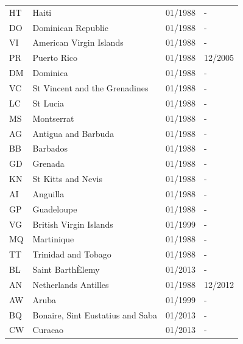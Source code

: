 \begin{footnotesize}
\begin{longtable}{p{0.5cm}p{9cm}p{2cm}p{2cm}}
HT	&	Haiti	&	01/1988	&	-	\\

DO	&	Dominican Republic	&	01/1988	&	-	\\

VI	&	American Virgin Islands	&	01/1988	&	-	\\

PR	&	Puerto Rico	&	01/1988	&	12/2005	\\

DM	&	Dominica	&	01/1988	&	-	\\

VC	&	St Vincent and the Grenadines	&	01/1988	&	-	\\

LC	&	St Lucia	&	01/1988	&	-	\\

MS	&	Montserrat	&	01/1988	&	-	\\

AG	&	Antigua and Barbuda	&	01/1988	&	-	\\

BB	&	Barbados	&	01/1988	&	-	\\

GD	&	Grenada	&	01/1988	&	-	\\

KN	&	St Kitts and Nevis	&	01/1988	&	-	\\

AI	&	Anguilla	&	01/1988	&	-	\\

GP	&	Guadeloupe	&	01/1988	&	-	\\

VG	&	British Virgin Islands	&	01/1999	&	-	\\

MQ	&	Martinique	&	01/1988	&	-	\\

TT	&	Trinidad and Tobago	&	01/1988	&	-	\\

BL	&	Saint BarthÈlemy	&	01/2013	&	-	\\

AN	&	Netherlands Antilles	&	01/1988	&	12/2012	\\

AW	&	Aruba	&	01/1999	&	-	\\

BQ	&	Bonaire, Sint Eustatius and Saba	&	01/2013	&	-	\\

CW	&	Curacao	&	01/2013	&	-	\\


\end{longtable}
\end{footnotesize}
